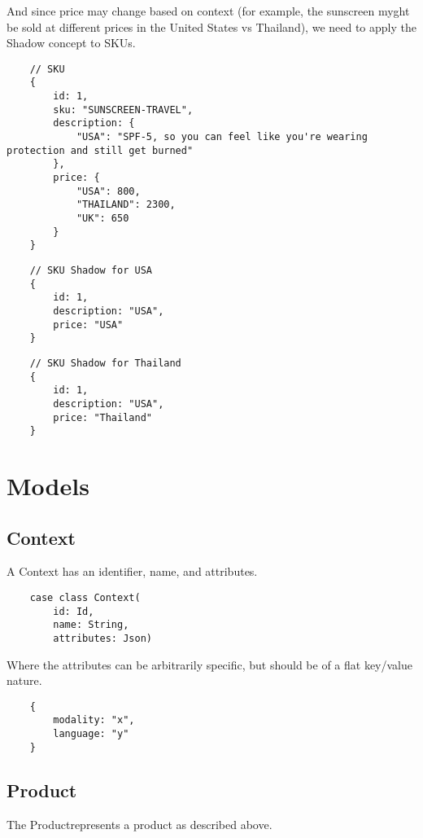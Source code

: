 \documentclass[11pt]{article}
\begin{document}
And since price may change based on context (for example, the sunscreen myght be sold at
different prices in the United States vs Thailand), we need to apply the Shadow concept to
SKUs.

\begin{lstlisting}
    // SKU
    {
        id: 1,
        sku: "SUNSCREEN-TRAVEL",
        description: {
            "USA": "SPF-5, so you can feel like you're wearing protection and still get burned"
        },
        price: {
            "USA": 800,
            "THAILAND": 2300,
            "UK": 650
        }
    }
\end{lstlisting}

\begin{lstlisting}
    // SKU Shadow for USA
    {
        id: 1,
        description: "USA",
        price: "USA"
    }
\end{lstlisting}

\begin{lstlisting}
    // SKU Shadow for Thailand
    {
        id: 1,
        description: "USA",
        price: "Thailand"
    }
\end{lstlisting}

\section{Models}

\subsection{Context}

A Context has an identifier, name, and attributes. 
\begin{lstlisting}
    case class Context(
        id: Id,
        name: String,
        attributes: Json)
\end{lstlisting}

Where the attributes can be arbitrarily specific, but should be of a flat key/value nature.

\begin{lstlisting}
    {
        modality: "x",
        language: "y"
    }
\end{lstlisting}


\subsection{Product}

The Productrepresents a product as described above. 
\end{document}
